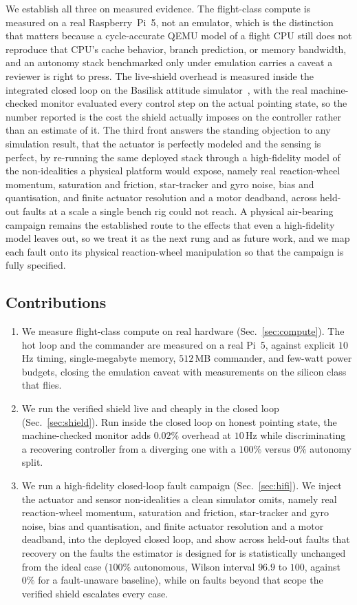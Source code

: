 \documentclass[journal]{IEEEtran}
\begin{document}
We establish all three on measured evidence. The flight-class compute is measured on a real
Raspberry~Pi~5, not an emulator, which is the distinction that matters because a cycle-accurate
QEMU model of a flight CPU still does not reproduce that CPU's cache behavior, branch prediction,
or memory bandwidth, and an autonomy stack benchmarked only under emulation carries a caveat a
reviewer is right to press. The live-shield overhead is measured inside the integrated closed
loop on the Basilisk attitude simulator~\cite{Basilisk}, with the real machine-checked monitor
evaluated every control step on the actual pointing state, so the number reported is the cost the
shield actually imposes on the controller rather than an estimate of it. The third front answers
the standing objection to any simulation result, that the actuator is perfectly modeled and the
sensing is perfect, by re-running the same deployed stack through a high-fidelity model of the
non-idealities a physical platform would expose, namely real reaction-wheel momentum, saturation
and friction, star-tracker and gyro noise, bias and quantisation, and finite actuator resolution
and a motor deadband, across held-out faults at a scale a single bench rig could not reach. A
physical air-bearing campaign remains the established route to the effects that even a
high-fidelity model leaves out, so we treat it as the next rung and as future work, and we map
each fault onto its physical reaction-wheel manipulation so that the campaign is fully specified.

\subsection{Contributions}
\begin{enumerate}[leftmargin=1.5em,itemsep=2pt]
\item We measure flight-class compute on real hardware (Sec.~\ref{sec:compute}). The hot
loop and the commander are measured on a real Pi~5, against explicit $10$\,Hz timing, single-megabyte
memory, $512$\,MB commander, and few-watt power budgets, closing the emulation caveat with
measurements on the silicon class that flies.
\item We run the verified shield live and cheaply in the closed loop (Sec.~\ref{sec:shield}). Run inside the closed
loop on honest pointing state, the machine-checked monitor adds $0.02\%$ overhead at $10$\,Hz while
discriminating a recovering controller from a diverging one with a $100\%$ versus $0\%$ autonomy
split.
\item We run a high-fidelity closed-loop fault campaign (Sec.~\ref{sec:hifi}). We inject the
actuator and sensor non-idealities a clean simulator omits, namely real reaction-wheel momentum,
saturation and friction, star-tracker and gyro noise, bias and quantisation, and finite actuator
resolution and a motor deadband, into the deployed closed loop, and show across held-out faults
that recovery on the faults the estimator is designed for is statistically unchanged from the
ideal case ($100\%$ autonomous, Wilson interval $96.9$ to $100$, against $0\%$ for a
fault-unaware baseline), while on faults beyond that scope the verified shield escalates every
case.
\end{enumerate}
\end{document}
